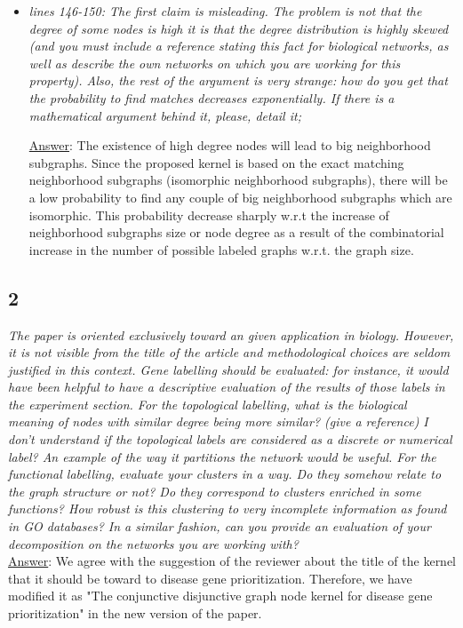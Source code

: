 \documentclass[11pt]{article}
\begin{document}
\begin{itemize}
\item \textit{lines 146-150: The first claim is misleading. The problem is not that the degree of some nodes is high it is that the degree distribution is highly skewed (and you must include a reference stating this fact for biological networks, as well as describe the own networks on which you are working for this property). Also, the rest of the argument is very strange: how do you get that the probability to find matches decreases exponentially. If there is a mathematical argument behind it, please, detail it;}

\underline{Answer}: The existence of high degree nodes will lead to big neighborhood subgraphs. Since the proposed kernel is based on the exact matching neighborhood subgraphs (isomorphic neighborhood subgraphs), there will be a low probability to find any couple of big neighborhood subgraphs which are isomorphic. This probability decrease sharply w.r.t the increase of neighborhood subgraphs size or node degree as a result of the combinatorial increase in the number of possible labeled graphs w.r.t. the graph size.

\end{itemize}

\subsection*{2} \textit{The paper is oriented exclusively toward an given application in biology. However, it is not visible from the title of the article and methodological choices are seldom justified in this context. Gene labelling should be evaluated: for instance, it would have been helpful to have a descriptive evaluation of the results of those labels in the experiment section. For the topological labelling, what is the biological meaning of nodes with similar degree being more similar? (give a reference) I don't understand if the topological labels are considered as a discrete or numerical label? An example of the way it partitions the network would be useful. For the functional labelling, evaluate your clusters in a way. Do they somehow relate to the graph structure or not? Do they correspond to clusters enriched in some functions? How robust is this clustering to very incomplete information as found in GO databases? In a similar fashion, can you provide an evaluation of your decomposition on the networks you are working with?} \\

\underline{Answer}: We agree with the suggestion of the reviewer about the title of the kernel that it should be toward to disease gene prioritization. Therefore, we have modified it as "The conjunctive disjunctive graph node kernel for disease gene prioritization" in the new version of the paper.\\
\end{document}
